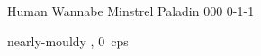 \filledCS%
  {\currentName}%
  {Human}%
  {Wannabe Minstrel}%
  {Paladin}%
  {{0}{0}{0}}%
  {{0}{-1}{-1}}%
  {%
    \renewcommand\rank{Fodder}
    \renewcommand\characterDebt{100 \glspl{sp}}
    \setcounter{Academics}{1}
    \setcounter{Cultivation}{1}
    \setcounter{Performance}{1}
    \setcounter{Stealth}{1}
    \setcounter{Medicine}{1}

    \setcounter{Brawl}{1}
    \setcounter{Projectiles}{1}
    \Dagger
  }%
  {\unstoppable}%
  {nearly-mouldy \rations, 0~\glspl{cp}}%


